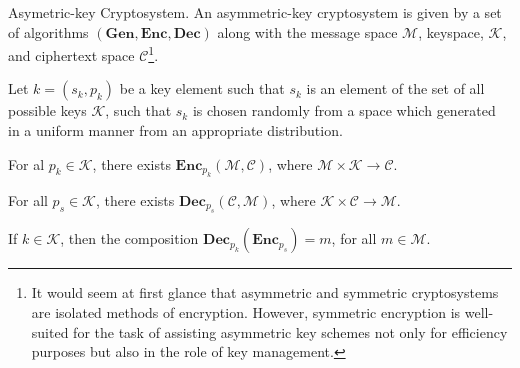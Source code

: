 \begin{defn}{Asymetric-key Cryptosystem. }
	An asymmetric-key cryptosystem is given by a set of algorithms $\mathbf{(Gen, Enc, Dec)}$ along with the message space $\mathcal{M}$, keyspace, $\mathcal{K}$, and ciphertext space $\mathcal{C}$\footnote{It would seem at first glance that asymmetric and symmetric cryptosystems are isolated methods of encryption. However, symmetric encryption is well-suited for the task of assisting asymmetric key schemes not only for efficiency purposes but also in the role of key management.}.

Let $k = (s_{k},p_{k})$ be a key element such that $s_{k}$ is an element of the set of all possible keys $\mathcal{K}$, such that $s_{k}$ is chosen randomly from a space which generated in a uniform manner from an appropriate distribution. 


For al $p_{k}\in \mathcal{K}$, there exists $\mathbf{Enc}_{p_{k}}(\mathcal{M,C})$, where $\mathcal{M} \times \mathcal{K} \rightarrow \mathcal{C}.$

For all $p_{s}\in \mathcal{K}$, there exists $\mathbf{Dec}_{p_{s}}(\mathcal{C,M})$, where $\mathcal{K} \times \mathcal{C} \rightarrow \mathcal{M}.$

If $k \in \mathcal{K}$, then the composition $\mathbf{Dec}_{p_{k}}(\mathbf{Enc}_{p_{s}}) = m$, for all $m \in \mathcal{M}$.

\end{defn}


